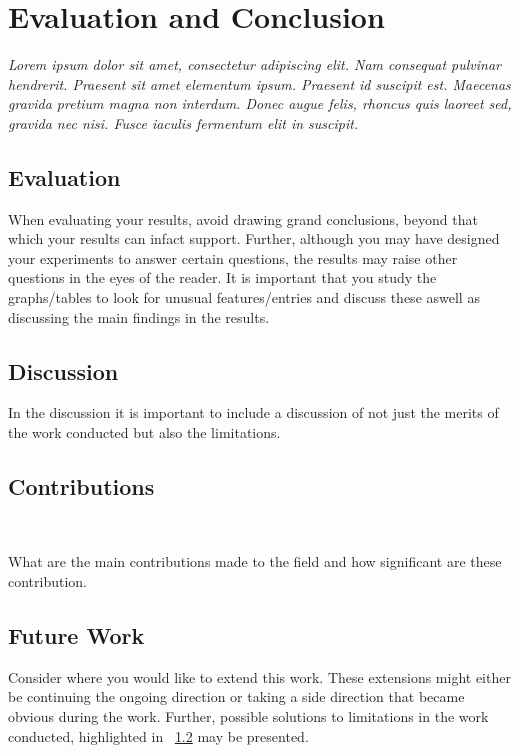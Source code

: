 \chapter{Evaluation and Conclusion}
\label{section:Discussion}

{\it Lorem ipsum dolor sit amet, consectetur adipiscing elit. Nam consequat pulvinar hendrerit. Praesent sit amet elementum ipsum. Praesent id suscipit est. Maecenas gravida pretium magna non interdum. Donec augue felis, rhoncus quis laoreet sed, gravida nec nisi. Fusce iaculis fermentum elit in suscipit. }

\section{Evaluation}
\label{sec:Evaluation}

When evaluating your results, avoid drawing grand conclusions, beyond that which your results can infact support. Further, although you may have designed your experiments to answer certain questions, the results may raise other questions in the eyes of the reader. It is important that you study the graphs/tables to look for unusual features/entries and discuss these aswell as discussing the main findings in the results. 

\section{Discussion}
\label{sec:Discussion}

In the discussion it is important to include a discussion of not just the merits of the work conducted but also the limitations. 

\section{Contributions}~\label{cont}
\label{sec:Contributions}

What are the main contributions made to the field and how significant are these contribution.  

\section{Future Work}
\label{sec:futureWork}

Consider where you would like to extend this work. These extensions might either be continuing the ongoing direction or taking a side direction that became obvious during the work. Further, possible solutions to limitations in the work conducted, highlighted in ~\ref{sec:Discussion} may be presented. 
